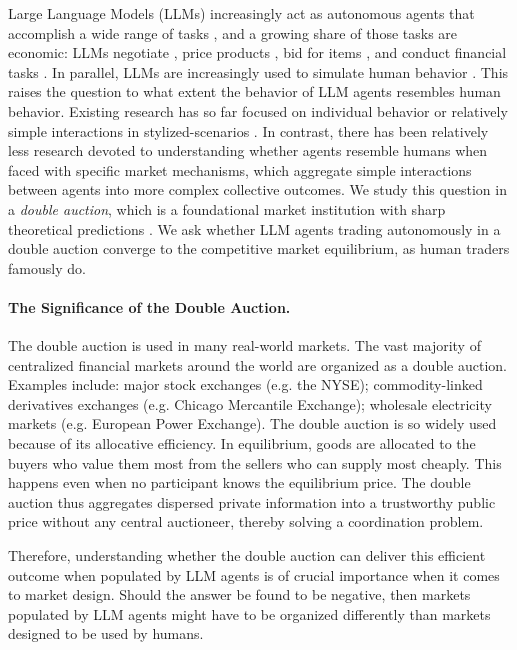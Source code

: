 \documentclass[letterpaper]{article} %
\begin{document}
Large Language Models (LLMs) increasingly act as autonomous agents that accomplish a wide range of tasks \citep{wang2024survey}, and a growing share of those tasks are economic: LLMs negotiate \citep{bianchi2024llmnegotiation}, price products \cite{fishAlgorithmicCollusionLarge2025}, bid for items \citep{chenPutYourMoney2024}, and conduct financial tasks \citep{yuFinConSynthesizedLLM2024}. In parallel, LLMs are increasingly used to simulate human behavior \citep{parkGenerativeAgentsInteractive2023, Argyle_Busby_Fulda_Gubler_Rytting_Wingate_2023}. This raises the question to what extent the behavior of LLM agents resembles human behavior. Existing research has so far focused on individual behavior \cite{hortonLargeLanguageModels2026} or relatively simple interactions in stylized-scenarios \cite{akataPlayingRepeatedGames2025}. In contrast, there has been relatively less research devoted to understanding whether agents resemble humans when faced with specific market mechanisms, which aggregate simple interactions between agents into more complex collective outcomes. We study this question in a \emph{double auction}, which is a foundational market institution with sharp theoretical predictions \citep{friedman2018double}. We ask whether LLM agents trading autonomously in a double auction converge to the competitive market equilibrium, as human traders famously do.

%

\paragraph{The Significance of the Double Auction.} The double auction is used in many real-world markets. The vast majority of centralized financial markets around the world are organized as a double auction. Examples include: major stock exchanges (e.g. the NYSE); commodity-linked derivatives exchanges (e.g. Chicago Mercantile Exchange); wholesale electricity markets (e.g. European Power Exchange).
The double auction is so widely used because of its allocative efficiency. In equilibrium, goods are allocated to the buyers who value them most from the sellers who can supply most cheaply. This happens even when no participant knows the equilibrium price. The double auction thus aggregates dispersed private information into a trustworthy public price without any central auctioneer, thereby solving a coordination problem.

Therefore, understanding whether the double auction can deliver this efficient outcome when populated by LLM agents is of crucial importance when it comes to market design. Should the answer be found to be negative, then markets populated by LLM agents might have to be organized differently than markets designed to be used by humans.
\end{document}
